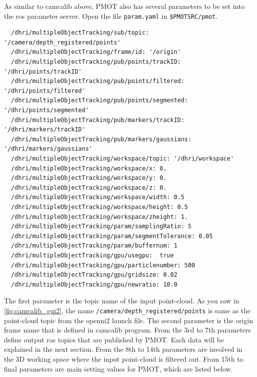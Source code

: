 \documentclass[a4paper,twoside, openright,12pt]{report}
\begin{document}
As similar to camcalib above, PMOT also has several parameters to be set into the ros parameter server.  
Open the file \verb|param.yaml| in \verb|$PMOTSRC/pmot|.
\begin{verbatim}
  /dhri/multipleObjectTracking/sub/topic: '/camera/depth_registered/points'
  /dhri/multipleObjectTracking/frame/id: '/origin'
  /dhri/multipleObjectTracking/pub/points/trackID: '/dhri/points/trackID'
  /dhri/multipleObjectTracking/pub/points/filtered: '/dhri/points/filtered'
  /dhri/multipleObjectTracking/pub/points/segmented: '/dhri/points/segmented'
  /dhri/multipleObjectTracking/pub/markers/trackID: '/dhri/markers/trackID'
  /dhri/multipleObjectTracking/pub/markers/gaussians: '/dhri/markers/gaussians'
  /dhri/multipleObjectTracking/workspace/topic: '/dhri/workspace'
  /dhri/multipleObjectTracking/workspace/x: 0.
  /dhri/multipleObjectTracking/workspace/y: 0.
  /dhri/multipleObjectTracking/workspace/z: 0.
  /dhri/multipleObjectTracking/workspace/width: 0.5
  /dhri/multipleObjectTracking/workspace/height: 0.5
  /dhri/multipleObjectTracking/workspace/zheight: 1.
  /dhri/multipleObjectTracking/param/samplingRatio: 5
  /dhri/multipleObjectTracking/param/segmentTolerance: 0.05
  /dhri/multipleObjectTracking/param/buffernum: 1
  /dhri/multipleObjectTracking/gpu/usegpu:  true
  /dhri/multipleObjectTracking/gpu/particlenumber: 500
  /dhri/multipleObjectTracking/gpu/gridsize: 0.02
  /dhri/multipleObjectTracking/gpu/newratio: 10.0
\end{verbatim}

The first parameter is the topic name of the input point-cloud. As you saw in \ref{fig:camcalib_gui2}, the name \verb|/camera/depth_registered/points| is same as the point-cloud topic from the openni2 launch file. The second parameter is the origin frame name that is defined in camcalib program. 
From the 3rd to 7th parameters define output ros topics that are published by PMOT. Each data will be explained in the next section. 
From the 8th to 14th parameters are involved in the 3D working space where the input point-cloud is filtered out. From 15th to final parameters are main setting values for PMOT, which are listed below. 
\end{document}
